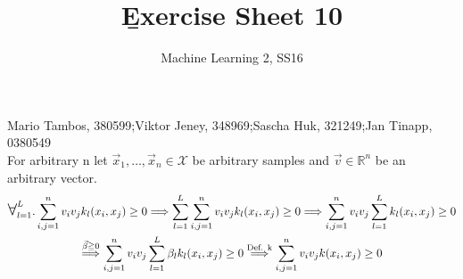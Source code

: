 \documentclass[a4paper]{article}
\newcommand{\1}{\mathds{1}}
\newcommand\bigforall{\mbox{\Large $\mathsurround0pt\forall$}}
\begin{document}
\title{\b{Exercise Sheet 10}}
\author{Machine Learning 2, SS16}

\maketitle

Mario Tambos, 380599;\quad Viktor Jeney, 348969;\quad Sascha Huk, 321249;\quad Jan Tinapp, 0380549\\

For arbitrary n let $\vec{x}_1, \ldots, \vec{x}_n \in \mathcal{X}$ be arbitrary samples 
and $\vec{v}\in\mathbb{R}^n$ be an arbitrary vector.
\begin{gather*}
	\bigforall_{l=1}^L. \sum_{i,j=1}^n v_i v_j k_l(x_i, x_j) \geq 0 
	\Longrightarrow
	\sum_{l=1}^L\sum_{i,j=1}^n v_i v_j k_l(x_i, x_j) \geq 0
	\Longrightarrow
	\sum_{i,j=1}^n v_i v_j \sum_{l=1}^L k_l(x_i, x_j) \geq 0 \\
	\stackrel{\vec{\beta}\geqq 0}{\Longrightarrow}
	\sum_{i,j=1}^n v_i v_j \sum_{l=1}^L \beta_l k_l(x_i, x_j) \geq 0
	\stackrel{\text{Def. k}}{\Longrightarrow}
	\sum_{i,j=1}^n v_i v_j k(x_i, x_j) \geq 0	
\end{gather*}
\end{document}
